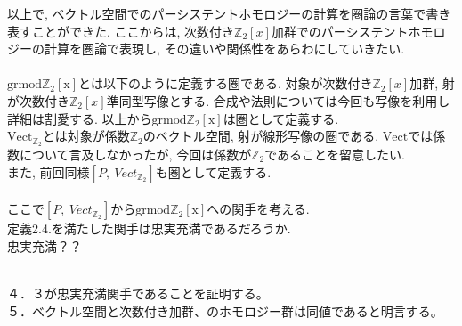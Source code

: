\documentclass[a4paper]{jsarticle}
\theoremstyle{definition}
\newcommand{\Fun}[2]{[#1,~#2]}
\newcommand{\Vect}{{\mathrm{Vect}}}
\newcommand{\grmodZ}{{\mathrm{grmod \mathbb{Z}_2[x]}}}
\begin{document}
以上で, ベクトル空間でのパーシステントホモロジーの計算を圏論の言葉で書き表すことができた. ここからは, 次数付き$\mathbb{Z}_2[x]$加群でのパーシステントホモロジーの計算を圏論で表現し, その違いや関係性をあらわにしていきたい.\\
\noindent\\
$\grmodZ$とは以下のように定義する圏である. 対象が次数付き$\mathbb{Z}_2[x]$加群, 射が次数付き$\mathbb{Z}_2[x]$準同型写像とする. 合成や法則については今回も写像を利用し詳細は割愛する. 以上から$\grmodZ$は圏として定義する. \\
$\Vect_{\mathbb{Z}_2}$とは対象が係数$\mathbb{Z}_2$のベクトル空間, 射が線形写像の圏である. $\Vect$では係数について言及しなかったが, 今回は係数が$\mathbb{Z}_2$であることを留意したい.\\
また, 前回同様$\Fun{P}{Vect_{\mathbb{Z}_2}}$も圏として定義する.\\
\noindent\\
ここで$\Fun{P}{Vect_{\mathbb{Z}_2}}$から$\grmodZ$への関手を考える.\\
定義2.4.を満たした関手は忠実充満であるだろうか.\\
忠実充満？？






\noindent\\
４．３が忠実充満関手であることを証明する。\\
５．ベクトル空間と次数付き加群、のホモロジー群は同値であると明言する。\\
\end{document}
